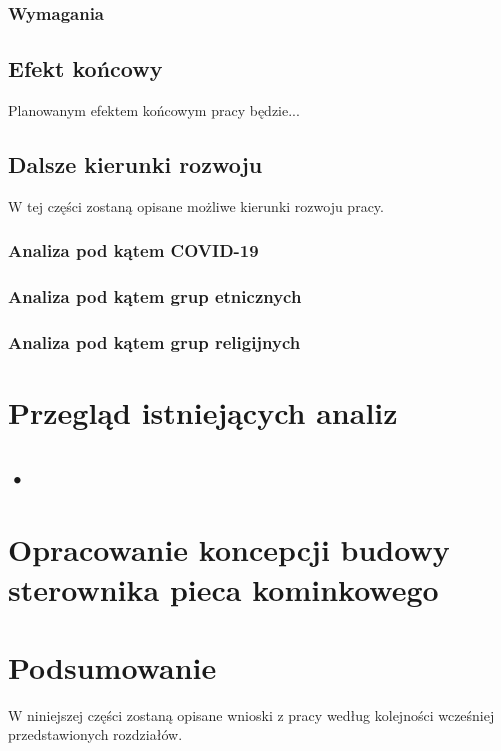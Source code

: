 \documentclass[11pt]{report}
\begin{document}
 \subsection{Wymagania}

 
 \section{Efekt końcowy}
 Planowanym efektem końcowym pracy będzie...
 
 \section{Dalsze kierunki rozwoju}
 W tej części zostaną opisane możliwe kierunki rozwoju pracy.
 \subsection{Analiza pod kątem COVID-19}
 \subsection{Analiza pod kątem grup etnicznych}
 \subsection{Analiza pod kątem grup religijnych}
 
 
 \chapter{Przegląd istniejących analiz}\label{ch:przeglad}
 \section{•}
  
   
  
 \chapter[Opracowanie koncepcji budowy sterownika\\ pieca kominkowego]{Opracowanie koncepcji budowy sterownika pieca kominkowego}\label{ch:koncepcja}
 
 
 \chapter{Podsumowanie}
W niniejszej części zostaną opisane wnioski z pracy według kolejności wcześniej przedstawionych rozdziałów.
\end{document}

